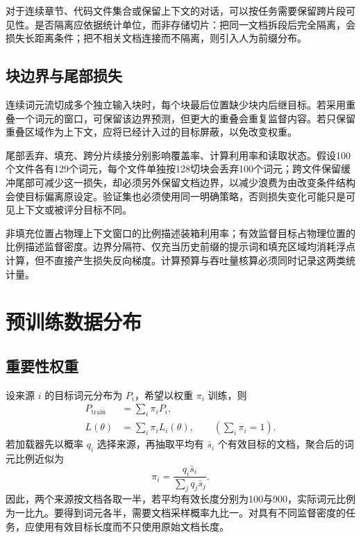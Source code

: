 \documentclass[../textbook.tex]{subfiles}
\begin{document}
对于连续章节、代码文件集合或保留上下文的对话，可以按任务需要保留跨片段可见性。是否隔离应依据统计单位，而非存储切片：把同一文档拆段后完全隔离，会损失长距离条件；把不相关文档连接而不隔离，则引入人为前缀分布。

\subsection{块边界与尾部损失}
连续词元流切成多个独立输入块时，每个块最后位置缺少块内后继目标。若采用重叠一个词元的窗口，可保留该边界预测，但更大的重叠会重复监督内容。若只保留重叠区域作为上下文，应将已经计入过的目标屏蔽，以免改变权重。

尾部丢弃、填充、跨分片续接分别影响覆盖率、计算利用率和读取状态。假设100个文件各有129个词元，每个文件单独按128切块会丢弃100个词元；跨文件保留缓冲尾部可减少这一损失，却必须另外保留文档边界，以减少浪费为由改变条件结构会使目标偏离原设定。验证集也必须使用同一明确策略，否则损失变化可能只是可见上下文或被评分目标不同。

\begin{note}[装箱利用率与有效监督密度]
非填充位置占物理上下文窗口的比例描述装箱利用率；有效监督目标占物理位置的比例描述监督密度。边界分隔符、仅充当历史前缀的提示词和填充区域均消耗浮点计算，但不直接产生损失反向梯度。计算预算与吞吐量核算必须同时记录这两类统计量。
\end{note}

\section{预训练数据分布}

\subsection{重要性权重}
设来源 $i$ 的目标词元分布为 $P_i$，希望以权重 $\pi_i$ 训练，则
\begin{equation}\label{eq:pt-mixture}
\begin{aligned}
 P_{\mathrm{train}} &= \sum_i\pi_iP_i, \\
 L(\theta) &= \sum_i\pi_iL_i(\theta), \qquad \left(\sum_i\pi_i=1\right).
\end{aligned}
\end{equation}
若加载器先以概率 $q_i$ 选择来源，再抽取平均有 $\bar s_i$ 个有效目标的文档，聚合后的词元比例近似为
\begin{equation}
 \pi_i=\frac{q_i\bar s_i}{\sum_jq_j\bar s_j}.
 \label{eq:pt-source-length}
\end{equation}
因此，两个来源按文档各取一半，若平均有效长度分别为100与900，实际词元比例为一比九。要得到词元各半，需要文档采样概率九比一。对具有不同监督密度的任务，应使用有效目标长度而不只使用原始文档长度。
\end{document}
